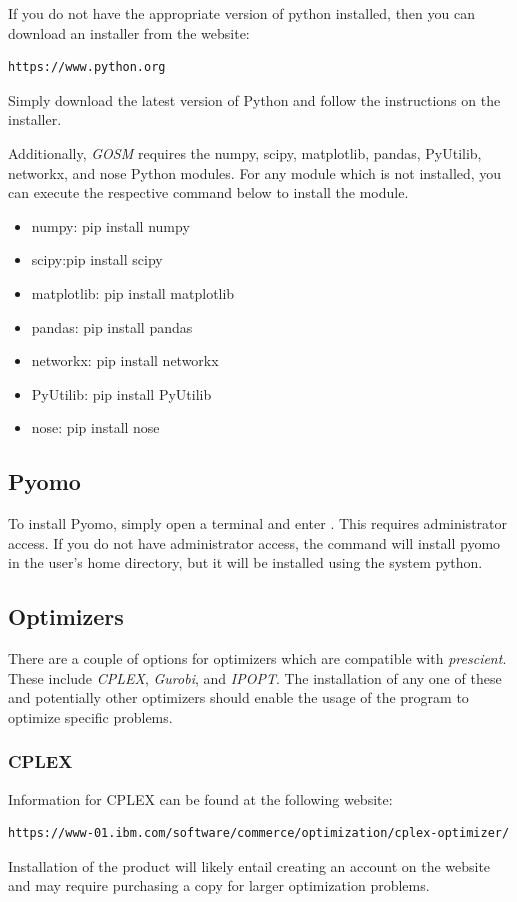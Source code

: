 \documentclass[11pt]{article}
\begin{document}
If you do not have the appropriate version of python installed, then you can download an installer from the website:
\begin{verbatim}
https://www.python.org
\end{verbatim}
Simply download the latest version of Python and follow the instructions on the installer.

Additionally, {\it GOSM} requires the numpy, scipy, matplotlib, pandas, PyUtilib, networkx, and nose Python modules.
For any module which is not installed, you can execute the respective command below to install the module.
\begin{itemize}
\item numpy: pip install numpy
\item scipy:pip install scipy
\item matplotlib: pip install matplotlib
\item pandas: pip install pandas
\item networkx: pip install networkx
\item PyUtilib: pip install PyUtilib
\item nose: pip install nose
\end{itemize}

\subsection{Pyomo}
To install Pyomo, simply open a terminal and enter .
This requires administrator access. If you do not have administrator access, 
the command  will install pyomo in the user's 
home directory, but it will be installed using the system python. 

\subsection{Optimizers}
There are a couple of options for optimizers which are compatible with \textit{prescient}. These include \textit{CPLEX}, \textit{Gurobi}, and \textit{IPOPT}.
The installation of any one of these and potentially other optimizers should enable the usage of the program to optimize specific problems.
\subsubsection{CPLEX}
Information for CPLEX can be found at the following website:
\begin{verbatim}
https://www-01.ibm.com/software/commerce/optimization/cplex-optimizer/
\end{verbatim}
Installation of the product will likely entail creating an account on the website and may require purchasing a copy for larger optimization problems.
\end{document}
